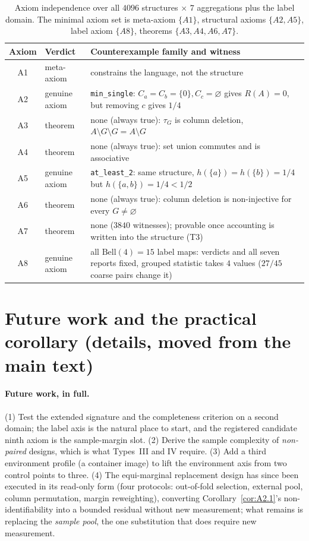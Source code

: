 \documentclass{article}
\begin{document}
\begin{table}[t]
\centering
\small
\caption{Axiom independence over all $4096$ structures $\times$ $7$ aggregations plus the label domain.
The minimal axiom set is meta-axiom $\{A1\}$, structural axioms $\{A2,A5\}$, label axiom $\{A8\}$,
theorems $\{A3,A4,A6,A7\}$.}
\label{tab:independence}
\begin{tabular}{@{}c p{1.9cm} p{7.6cm}@{}}
\toprule
Axiom & Verdict & Counterexample family and witness \\
\midrule
A1 & meta-axiom & constrains the language, not the structure \\
A2 & genuine axiom & \texttt{min\_single}: $C_a{=}C_b{=}\{0\}, C_c{=}\varnothing$ gives $R(A){=}0$, but removing $c$ gives $1/4$ \\
A3 & theorem & none (always true): $\tau_G$ is column deletion, $A\setminus G\setminus G=A\setminus G$ \\
A4 & theorem & none (always true): set union commutes and is associative \\
A5 & genuine axiom & \texttt{at\_least\_2}: same structure, $h(\{a\}){=}h(\{b\}){=}1/4$ but $h(\{a,b\}){=}1/4<1/2$ \\
A6 & theorem & none (always true): column deletion is non-injective for every $G\neq\varnothing$ \\
A7 & theorem & none ($3840$ witnesses); provable once accounting is written into the structure (T3) \\
A8 & genuine axiom & all $\mathrm{Bell}(4){=}15$ label maps: verdicts and all seven reports fixed, grouped statistic takes $4$ values ($27/45$ coarse pairs change it) \\
\bottomrule
\end{tabular}
\end{table}

\section{Future work and the practical corollary (details, moved from the main text)}
\label{app:monday}

\paragraph{Future work, in full.} (1) Test the extended signature and the completeness criterion on a
second domain; the label axis is the natural place to start, and the registered candidate ninth axiom is
the sample-margin slot. (2) Derive the sample complexity of \emph{non-paired} designs, which is what
Types~III and IV require. (3) Add a third environment profile (a container image) to lift the environment
axis from two control points to three. (4) The equi-marginal replacement design has since been executed in
its read-only form (four protocols: out-of-fold selection, external pool, column permutation, margin
reweighting), converting Corollary~\ref{cor:A2.1}'s non-identifiability into a bounded residual without new
measurement; what remains is replacing the \emph{sample pool}, the one substitution that does require new
measurement.
\end{document}
